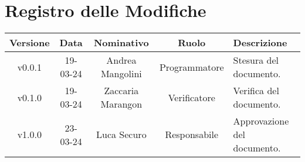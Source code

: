 \section*{\Large Registro delle Modifiche}
    \begin{table}[h]
        \centering
        \renewcommand\tabularxcolumn[1]{m{#1}} %
        \renewcommand{\arraystretch}{1.5}
        \begin{tabularx}{0.98\textwidth}
            {c|c|c|c|>{\centering\arraybackslash}X}
            \rowcolor{black}
            \textbf{\color{white} Versione} & \textbf{\color{white} Data} & \textbf{\color{white} Nominativo} & \textbf{\color{white} Ruolo} & \textbf{\color{white} Descrizione} \\ 
            \hline

            v0.0.1 & 19-03-24 & Andrea Mangolini & Programmatore & Stesura del documento. \\
            v0.1.0 & 19-03-24 & Zaccaria Marangon & Verificatore & Verifica del documento. \\
            v1.0.0 & 23-03-24 & Luca Securo & Responsabile & Approvazione del documento. \\
            \hline
        \end{tabularx}
    \end{table}